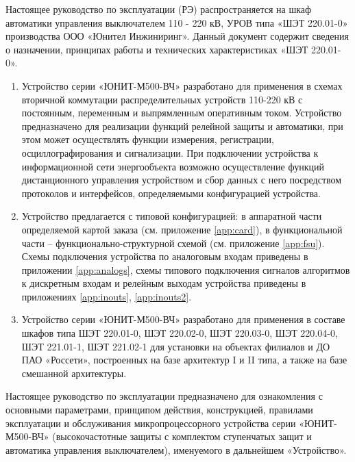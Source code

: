 \par
Настоящее руководство по эксплуатации (РЭ) распространяется на шкаф автоматики управления выключателем 110 - 220 кВ, УРОВ типа «ШЭТ 220.01-0» производства ООО «Юнител Инжиниринг».
Данный документ содержит сведения о назначении, принципах работы и технических характеристиках «ШЭТ 220.01-0».


\color{black}

\begin{enumerate}[label=\arabic{section}.\arabic{subsection}.\arabic*, labelsep=4pt, leftmargin=0pt, itemindent=57pt]

\item
Устройство серии «ЮНИТ-М500-ВЧ» разработано для применения в схемах вторичной коммутации распределительных устройств 110-220 кВ с постоянным, переменным и выпрямленным оперативным током.
Устройство предназначено для реализации функций релейной защиты и автоматики, при этом может осуществлять функции измерения, регистрации, осциллографирования и сигнализации.
При подключении устройства к информационной сети энергообъекта возможно осуществление функций дистанционного управления устройством и сбор данных с него посредством протоколов и интерфейсов, определяемыми конфигурацией устройства.

\item 
Устройство предлагается с типовой конфигурацией: в аппаратной части определяемой картой заказа {\color{red}(см. приложение \ref{app:card}), в функциональной части -- функционально-структурной схемой (см. приложение \ref{app:fsu}). Схемы подключения устройства по аналоговым входам приведены в приложении \ref{app:analogs}, схемы типового подключения сигналов алгоритмов к дискретным входам и релейным выходам устройства приведены в приложениях \ref{app:inouts}, \ref{app:inouts2}.}

\item
Устройство серии «ЮНИТ-М500-ВЧ» разработано для применения в составе шкафов типа ШЭТ 220.01-0, ШЭТ 220.02-0, ШЭТ 220.03-0, ШЭТ 220.04-0, ШЭТ 221.01-1, ШЭТ 221.02-1 для установки на объектах филиалов и ДО ПАО «Россети», построенных на базе архитектур I и II типа, а также на базе смешанной архитектуры.

\end{enumerate}

\par
Настоящее руководство по эксплуатации предназначено для ознакомления с основными параметрами, принципом действия, конструкцией, правилами эксплуатации и обслуживания микропроцессорного устройства серии «ЮНИТ-М500-ВЧ» (высокочастотные защиты с комплектом ступенчатых защит и автоматика управления выключателем), именуемого в дальнейшем «Устройство».

